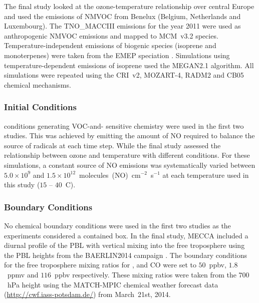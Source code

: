 The final study looked at the ozone-temperature relationship over central Europe and used the emissions of NMVOC from Benelux (Belgium, Netherlands and Luxembourg).
The TNO\_MACCIII emissions for the year 2011 were used as anthropogenic NMVOC emissions and mapped to MCM~v3.2 species.
Temperature-independent emissions of biogenic species (isoprene and monoterpenes) were taken from the EMEP speciation \citep{Simpson:2012}.
Simulations using temperature-dependent emissions of isoprene used the MEGAN2.1 \citep{Guenther:2012} algorithm.
All simulations were repeated using the CRI~v2, MOZART-4, RADM2 and CB05 chemical mechanisms.

\vspace{-1mm}
\subsubsection{ Initial Conditions} 
 conditions generating VOC-and- sensitive chemistry were used in the first two studies.
This was achieved by emitting the amount of NO required to balance the source of radicals at each time step.
While the final study assessed the relationship between ozone and temperature with different  conditions.
For these simulations, a constant source of NO emissions was systematically varied between $5.0 \times 10^9$ and $1.5 \times 10^{12}$~molecules~(NO)~cm$^{-2}$~s$^{-1}$ at each temperature used in this study ($15$ -- $40$~\degree C).

\newpage
\subsubsection{Boundary Conditions} 
No chemical boundary conditions were used in the first two studies as the experiments considered a contained box.
In the final study, MECCA included a diurnal profile of the PBL with vertical mixing into the free troposphere using the PBL heights from the BAERLIN2014 campaign \citep{Bonn:2016}.
The boundary conditions for the free troposphere mixing ratios for ,  and CO were set to $50$~ppbv, $1.8$~ppmv and $116$~ppbv respectively. 
These mixing ratios were taken from the $700$~hPa height using the MATCH-MPIC chemical weather forecast data (\url{http://cwf.iass-potsdam.de/}) from March~21st, 2014.
